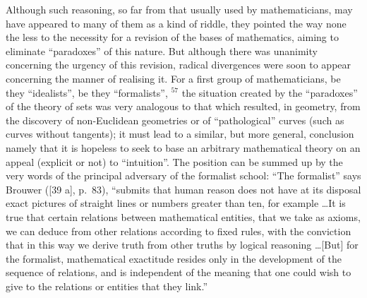 Although such reasoning, so far from that usually used by mathematicians, may have appeared to many of them as a kind of riddle, they pointed the way none the less to the necessity for a revision of the bases of mathematics, aiming to eliminate ``paradoxes'' of this nature. But although there was unanimity concerning the urgency of this revision, radical divergences were soon to appear concerning the manner of realising it. For a first group of mathematicians, be they ``idealists'', be they ``formalists'', \(^{57}\) the situation created by the ``paradoxes'' of the theory of sets was very analogous to that which resulted, in geometry, from the discovery of non-Euclidean geometries or of ``pathological'' curves (such as curves without tangents); it must lead to a similar, but more general, conclusion namely that it is hopeless to seek to base an arbitrary mathematical theory on an appeal (explicit or not) to ``intuition''. The position can be summed up by the very words of the principal adversary of the formalist school: ``The formalist'' says Brouwer ({[}39 a{]}, p.~83), ``submits that human reason does not have at its disposal exact pictures of straight lines or numbers greater than ten, for example \ldots It is true that certain relations between mathematical entities, that we take as axioms, we can deduce from other relations according to fixed rules, with the conviction that in this way we derive truth from other truths by logical reasoning \ldots{[}But{]} for the formalist, mathematical exactitude resides only in the development of the sequence of relations, and is independent of the meaning that one could wish to give to the relations or entities that they link.''

